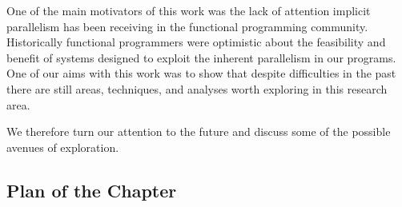 One of the main motivators of this work was the lack of attention implicit
parallelism has been receiving in the functional programming community. Historically
functional programmers were optimistic about the feasibility and benefit of systems
designed to exploit the inherent parallelism in our programs. One of our aims with
this work was to show that despite difficulties in the past there are still areas,
techniques, and analyses worth exploring in this research area.

We therefore turn our attention to the future and discuss some of the possible
avenues of exploration.

\subsection*{Plan of the Chapter}
